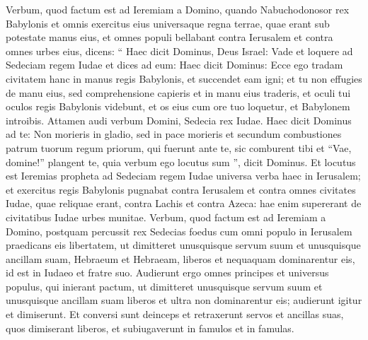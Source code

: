 \begin{biblechapter}
\begin{biblechapter}
\begin{biblechapter}
\begin{biblechapter}
\begin{biblechapter}
\begin{biblechapter}
\begin{biblechapter}
\begin{biblechapter}
\begin{biblechapter}
\begin{biblechapter}
\begin{biblechapter}
\begin{biblechapter}
\begin{biblechapter}
\begin{biblechapter}
\begin{biblechapter}
\begin{biblechapter}
\begin{biblechapter}
\begin{biblechapter}
\begin{biblechapter}
\begin{biblechapter}
\begin{biblechapter}
\begin{biblechapter}
\begin{biblechapter}
\begin{biblechapter}
\begin{biblechapter}
\begin{biblechapter}
\begin{biblechapter}
\begin{biblechapter}
\begin{biblechapter}
\begin{biblechapter}
\begin{biblechapter}
\begin{biblechapter}
\begin{biblechapter}
\begin{biblechapter}
\verse Verbum, quod factum est ad Ieremiam a Domino, quando Nabuchodonosor rex Babylonis et omnis exercitus eius universaque regna terrae, quae erant sub potestate manus eius, et omnes populi bellabant contra Ierusalem et contra omnes urbes eius, dicens: 
\verse “ Haec dicit Dominus, Deus Israel: Vade et loquere ad Sedeciam regem Iudae et dices ad eum: Haec dicit Dominus: Ecce ego tradam civitatem hanc in manus regis Babylonis, et succendet eam igni; 
\verse et tu non effugies de manu eius, sed comprehensione capieris et in manu eius traderis, et oculi tui oculos regis Babylonis videbunt, et os eius cum ore tuo loquetur, et Babylonem introibis. 
\verse Attamen audi verbum Domini, Sedecia rex Iudae. Haec dicit Dominus ad te: Non morieris in gladio, 
\verse sed in pace morieris et secundum combustiones patrum tuorum regum priorum, qui fuerunt ante te, sic comburent tibi et “Vae, domine!” plangent te, quia verbum ego locutus sum ”, dicit Dominus. 
\verse Et locutus est Ieremias propheta ad Sedeciam regem Iudae universa verba haec in Ierusalem; 
\verse et exercitus regis Babylonis pugnabat contra Ierusalem et contra omnes civitates Iudae, quae reliquae erant, contra Lachis et contra Azeca: hae enim supererant de civitatibus Iudae urbes munitae.
 \verse Verbum, quod factum est ad Ieremiam a Domino, postquam percussit rex Sedecias foedus cum omni populo in Ierusalem praedicans eis libertatem, 
\verse ut dimitteret unusquisque servum suum et unusquisque ancillam suam, Hebraeum et Hebraeam, liberos et nequaquam dominarentur eis, id est in Iudaeo et fratre suo. 
 \verse Audierunt ergo omnes principes et universus populus, qui inierant pactum, ut dimitteret unusquisque servum suum et unusquisque ancillam suam liberos et ultra non dominarentur eis; audierunt igitur et dimiserunt. 
\verse Et conversi sunt deinceps et retraxerunt servos et ancillas suas, quos dimiserant liberos, et subiugaverunt in famulos et in famulas. 

\end{biblechapter}
\end{biblechapter}
\end{biblechapter}
\end{biblechapter}
\end{biblechapter}
\end{biblechapter}
\end{biblechapter}
\end{biblechapter}
\end{biblechapter}
\end{biblechapter}
\end{biblechapter}
\end{biblechapter}
\end{biblechapter}
\end{biblechapter}
\end{biblechapter}
\end{biblechapter}
\end{biblechapter}
\end{biblechapter}
\end{biblechapter}
\end{biblechapter}
\end{biblechapter}
\end{biblechapter}
\end{biblechapter}
\end{biblechapter}
\end{biblechapter}
\end{biblechapter}
\end{biblechapter}
\end{biblechapter}
\end{biblechapter}
\end{biblechapter}
\end{biblechapter}
\end{biblechapter}
\end{biblechapter}
\end{biblechapter}
